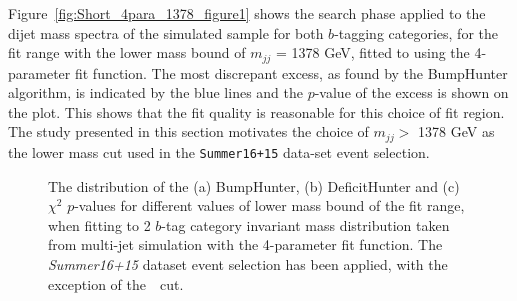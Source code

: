 Figure~\ref{fig:Short_4para_1378_figure1} shows the search phase applied to the dijet mass spectra
of the simulated sample for both $b$-tagging categories,
for the fit range with the lower mass bound of $m_{jj}$ = 1378 GeV,
fitted to using the 4-parameter fit function.
The most discrepant excess, as found by the BumpHunter algorithm, is indicated by the blue lines
and the $p$-value of the excess is shown on the plot.
This shows that the fit quality is reasonable for this choice of fit region.
The study presented in this section motivates the choice of $m_{jj} >$ 1378 GeV
as the lower mass cut used in the \verb|Summer16+15| data-set event selection.

\begin{figure}[!htb]
  \begin{center}
    \captionsetup[subfigure]{aboveskip=0pt,justification=centering}
  \end{center}
  \caption{The distribution of the (a) BumpHunter, (b) DeficitHunter and (c) $\chi^{2}$ $p$-values
    for different values of lower mass bound of the fit range, when fitting to 2 $b$-tag category
    invariant mass distribution taken from multi-jet simulation with the 4-parameter fit function.
    The \textit{Summer16+15} dataset event selection has been applied, with the exception of the~\mjj~cut.}
  \label{fig:mjjGraphs_bb}
\end{figure}

